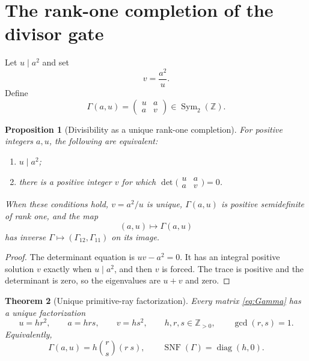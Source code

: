 \documentclass[11pt]{article}
\newtheorem{theorem}{Theorem}[section]
\newtheorem{proposition}[theorem]{Proposition}
\theoremstyle{definition}
\theoremstyle{remark}
\newcommand{\Z}{\mathbb Z}
\newcommand{\Sym}{\operatorname{Sym}}
\newcommand{\diag}{\operatorname{diag}}
\newcommand{\SNF}{\operatorname{SNF}}
\begin{document}
\section{The rank-one completion of the divisor gate}

Let $u\mid a^2$ and set
\begin{equation}\label{eq:v}
 v=\frac{a^2}{u}.
\end{equation}
Define
\begin{equation}\label{eq:Gamma}
 \Gamma(a,u)
 =\begin{pmatrix}u&a\\a&v\end{pmatrix}
 \in\Sym_2(\Z).
\end{equation}

\begin{proposition}[Divisibility as a unique rank-one completion]
\label{prop:completion}
For positive integers $a,u$, the following are equivalent:
\begin{enumerate}[label=(\roman*)]
\item $u\mid a^2$;
\item there is a positive integer $v$ for which
$\det\bigl(\begin{smallmatrix}u&a\\a&v\end{smallmatrix}\bigr)=0$.
\end{enumerate}
When these conditions hold, $v=a^2/u$ is unique, $\Gamma(a,u)$ is positive
semidefinite of rank one, and the map
\begin{equation}\label{eq:completion-map}
 (a,u)\longmapsto\Gamma(a,u)
\end{equation}
has inverse $\Gamma\mapsto(\Gamma_{12},\Gamma_{11})$ on its image.
\end{proposition}

\begin{proof}
The determinant equation is $uv-a^2=0$.  It has an integral positive solution
$v$ exactly when $u\mid a^2$, and then $v$ is forced.  The trace is positive
and the determinant is zero, so the eigenvalues are $u+v$ and zero.
\end{proof}

\begin{theorem}[Unique primitive-ray factorization]\label{thm:primitive}
Every matrix \eqref{eq:Gamma} has a unique factorization
\begin{equation}\label{eq:primitive-factorization}
 u=hr^2,
 \qquad
 a=hrs,
 \qquad
 v=hs^2,
 \qquad
 h,r,s\in\Z_{>0},
 \qquad
 \gcd(r,s)=1.
\end{equation}
Equivalently,
\begin{equation}\label{eq:Gamma-ray}
 \Gamma(a,u)=h\binom r s(r\ s),
 \qquad
 \SNF(\Gamma)=\diag(h,0).
\end{equation}
\end{theorem}
\end{document}
